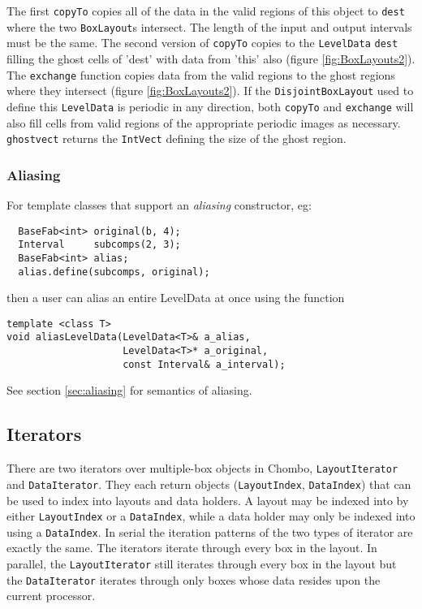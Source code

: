 \begin{trivlist}
The first {\tt copyTo} copies all of the data in the valid regions of 
this object to {\tt dest} where the two
{\tt BoxLayout}s intersect.  The length of the input and
output intervals must be the same.
The second version of {\tt copyTo} copies to the {\tt LevelData} 
{\tt dest} filling the ghost cells of 'dest' with data from 'this' also
(figure \ref{fig:BoxLayouts2}).
The \verb/exchange/ function copies data from the valid regions to the ghost
regions where they intersect (figure \ref{fig:BoxLayouts2}).  If the
{\tt DisjointBoxLayout} used to define this {\tt LevelData} is
periodic in any direction, both \verb/copyTo/ and \verb/exchange/ will
also fill cells from valid regions of the appropriate periodic images
as necessary.
{\tt ghostvect} returns the {\tt IntVect} defining the size of the ghost
region.
\end{trivlist}

\subsubsection{Aliasing}

  For template classes that support an {\em aliasing} constructor, eg:

\begin{verbatim}
  BaseFab<int> original(b, 4);
  Interval     subcomps(2, 3);
  BaseFab<int> alias;
  alias.define(subcomps, original);
\end{verbatim}

then a user can alias an entire LevelData at once  using the function

\begin{verbatim}
template <class T>
void aliasLevelData(LevelData<T>& a_alias, 
                    LevelData<T>* a_original, 
                    const Interval& a_interval);
\end{verbatim}

See section \ref{sec:aliasing} for semantics of aliasing.


\subsection{Iterators}
\label{IteratorSection}

There are two iterators over multiple-box objects in Chombo,
\verb/LayoutIterator/ and \verb/DataIterator/. They each return objects
({\tt LayoutIndex}, {\tt DataIndex}) that can be used to index into
layouts and data holders.  A layout may be indexed
into by either {\tt LayoutIndex} or a {\tt DataIndex}, while a 
data holder may only be indexed into using a \verb/DataIndex/.
In serial the iteration patterns of the two types of iterator 
are exactly the same.  The iterators iterate through every box in
the layout.  In parallel, the \verb/LayoutIterator/ still
iterates through every box in the layout but the \verb/DataIterator/
iterates through only boxes whose data resides upon the current processor.

